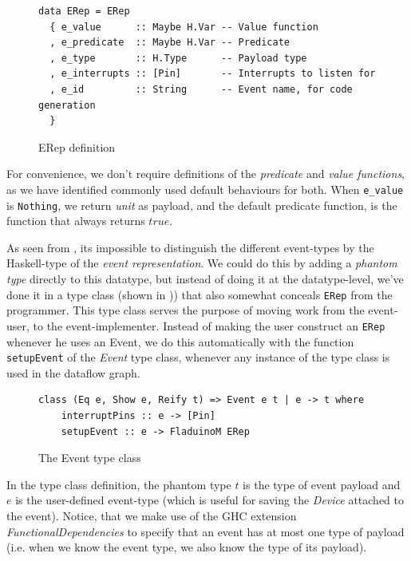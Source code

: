 \documentclass[a4paper, oneside, final]{memoir}
\let\Fref\undefined
\begin{document}
\begin{figure}
  \centering
\begin{verbatim}
data ERep = ERep
  { e_value      :: Maybe H.Var -- Value function
  , e_predicate  :: Maybe H.Var -- Predicate
  , e_type       :: H.Type      -- Payload type
  , e_interrupts :: [Pin]       -- Interrupts to listen for
  , e_id         :: String      -- Event name, for code generation
  }
\end{verbatim}

  \caption{ERep definition}
  \label{fig:Erep}
\end{figure}

For convenience, we don't require definitions of the
\textit{predicate} and \textit{value functions}, as we have identified
commonly used default behaviours for both. When \verb|e_value| is
\verb|Nothing|, we return \textit{unit} as payload, and the default
predicate function, is the function that always returns $true$.

As seen from \Fref{fig:Erep}, its impossible to distinguish the
different event-types by the Haskell-type of the \textit{event
  representation}. We could do this by adding a \textit{phantom type}
directly to this datatype, but instead of doing it at the
datatype-level, we've done it in a type class (shown in
\Fref{fig:Event type class})) that also somewhat conceals \verb|ERep| from
the programmer. This type class serves the purpose of moving work from
the event-user, to the event-implementer. Instead of making the user
construct an \verb|ERep| whenever he uses an Event, we do this
automatically with the function \verb|setupEvent| of the \textit{Event}
type class, whenever any instance of the type class is used in the
dataflow graph.

\begin{figure}
\centering
 \begin{verbatim}
class (Eq e, Show e, Reify t) => Event e t | e -> t where
    interruptPins :: e -> [Pin]
    setupEvent :: e -> FladuinoM ERep
\end{verbatim}
\caption{The Event type class}
\label{fig:Event type class}
\end{figure}

In the type class definition, the phantom type $t$ is the type of
event payload and $e$ is the user-defined event-type (which is useful
for saving the \textit{Device} attached to the event). Notice, that we
make use of the GHC extension \textit{FunctionalDependencies} to
specify that an event has at most one type of payload (i.e. when
we know the event type, we also know the type of its payload).
\end{document}

